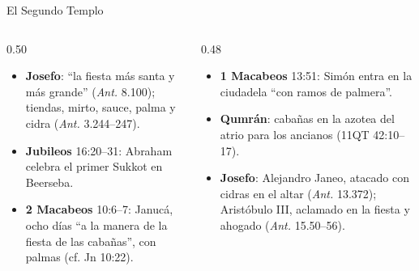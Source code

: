 \begin{frame}{El Segundo Templo}
\begin{columns}[t,onlytextwidth]
\begin{column}{0.50\textwidth}\scriptsize
\begin{itemize}
\item \textbf{Josefo}: ``la fiesta más santa y más grande'' (\emph{Ant.} 8.100); tiendas, mirto, sauce, palma y cidra (\emph{Ant.} 3.244--247).
\item \textbf{Jubileos} 16:20--31: Abraham celebra el primer Sukkot en Beerseba.
\item \textbf{2 Macabeos} 10:6--7: Janucá, ocho días ``a la manera de la fiesta de las cabañas'', con palmas (cf. Jn 10:22).
\end{itemize}
\end{column}
\begin{column}{0.48\textwidth}\scriptsize
\begin{itemize}
\item \textbf{1 Macabeos} 13:51: Simón entra en la ciudadela ``con ramos de palmera''.
\item \textbf{Qumrán}: cabañas en la azotea del atrio para los ancianos (11QT 42:10--17).
\item \textbf{Josefo}: Alejandro Janeo, atacado con cidras en el altar (\emph{Ant.} 13.372); Aristóbulo III, aclamado en la fiesta y ahogado (\emph{Ant.} 15.50--56).
\end{itemize}
\end{column}
\end{columns}\par\medskip
{}
\end{frame}

